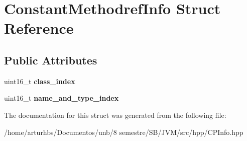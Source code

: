 \hypertarget{structConstantMethodrefInfo}{}\section{Constant\+Methodref\+Info Struct Reference}
\label{structConstantMethodrefInfo}
\subsection*{Public Attributes}
\begin{DoxyCompactItemize}
\item 
uint16\+\_\+t {\bfseries class\+\_\+index}\hypertarget{structConstantMethodrefInfo_abfb8e54d37521bee9c139d65f90facab}{}\label{structConstantMethodrefInfo_abfb8e54d37521bee9c139d65f90facab}

\item 
uint16\+\_\+t {\bfseries name\+\_\+and\+\_\+type\+\_\+index}\hypertarget{structConstantMethodrefInfo_a975a0ae57988a9bccf68c75a4f6fee43}{}\label{structConstantMethodrefInfo_a975a0ae57988a9bccf68c75a4f6fee43}

\end{DoxyCompactItemize}


The documentation for this struct was generated from the following file\+:\begin{DoxyCompactItemize}
\item 
/home/arturhbs/\+Documentos/unb/8 semestre/\+S\+B/\+J\+V\+M/src/hpp/C\+P\+Info.\+hpp\end{DoxyCompactItemize}
